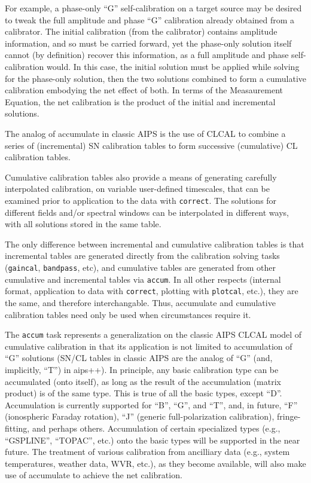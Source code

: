For example, a phase-only ``G'' self-calibration on a target source may be
desired to tweak the full amplitude and phase ``G'' calibration already
obtained from a calibrator. The initial calibration (from the calibrator)
contains amplitude information, and so must be carried forward, yet the
phase-only solution itself cannot (by definition) recover this
information, as a full amplitude and phase self-calibration would. In this
case, the initial solution must be applied while solving for the
phase-only solution, then the two solutions combined to form a cumulative
calibration embodying the net effect of both. In terms of the Measaurement
Equation, the net calibration is the product of the initial and
incremental solutions.

The analog of accumulate in classic AIPS is the use of CLCAL to combine a
series of (incremental) SN calibration tables to form successive
(cumulative) CL calibration tables.

Cumulative calibration tables also provide a means of generating
carefully interpolated calibration, on variable user-defined
timescales, that can be examined prior to application to the data with
{\tt correct}. The solutions for different fields and/or spectral
windows can be interpolated in different ways, with all solutions
stored in the same table.

The only difference between incremental and cumulative calibration
tables is that incremental tables are generated directly from the
calibration solving tasks ({\tt gaincal}, {\tt bandpass}, etc), and
cumulative tables are generated from other cumulative and incremental
tables via {\tt accum}. In all other respects (internal format,
application to data with {\tt correct}, plotting with {\tt plotcal},
etc.), they are the same, and therefore interchangable. Thus,
accumulate and cumulative calibration tables need only be used when
circumstances require it.

The {\tt accum} task represents a generalization on the classic AIPS
CLCAL model of cumulative calibration in that its application is not
limited to accumulation of ``G'' solutions (SN/CL tables in classic AIPS are
the analog of ``G'' (and, implicitly, ``T'') in aips++). In principle, any
basic calibration type can be accumulated (onto itself), as long as the
result of the accumulation (matrix product) is of the same type. This is
true of all the basic types, except ``D''. Accumulation is currently
supported for ``B'', ``G'', and ``T'', and, in future, ``F'' (ionospheric
Faraday rotation), ``J'' (generic full-polarization calibration),
fringe-fitting, and perhaps others. Accumulation of certain specialized
types (e.g., ``GSPLINE'', ``TOPAC'', etc.) onto the basic types will be
supported in the near future. The treatment of various calibration from
ancilliary data (e.g., system temperatures, weather data, WVR, etc.), as
they become available, will also make use of accumulate to achieve the net
calibration.

